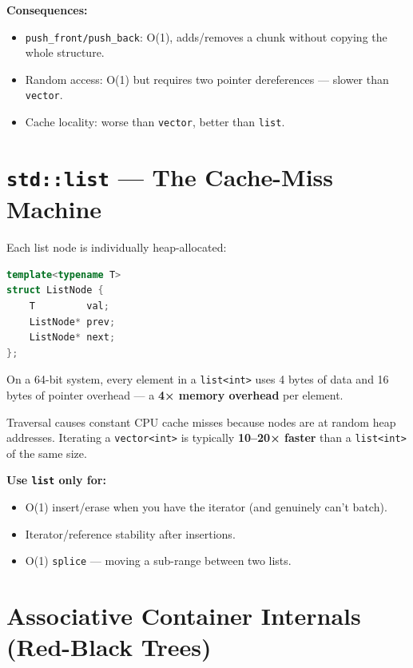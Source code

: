 \textbf{Consequences:}
\begin{itemize}
    \item \texttt{push\_front/push\_back}: O(1), adds/removes a chunk without copying the whole structure.
    \item Random access: O(1) but requires two pointer dereferences --- slower than \texttt{vector}.
    \item Cache locality: worse than \texttt{vector}, better than \texttt{list}.
\end{itemize}

\section{\texttt{std::list} --- The Cache-Miss Machine}
\label{sec:list-internals}

Each list node is individually heap-allocated:

\begin{lstlisting}[language=C++, caption={Conceptual list node layout}]
template<typename T>
struct ListNode {
    T         val;
    ListNode* prev;
    ListNode* next;
};
\end{lstlisting}

On a 64-bit system, every element in a \texttt{list<int>} uses 4 bytes of data and 16 bytes of pointer overhead --- a \textbf{4× memory overhead} per element.

Traversal causes constant CPU cache misses because nodes are at random heap addresses. Iterating a \texttt{vector<int>} is typically \textbf{10--20× faster} than a \texttt{list<int>} of the same size.

\textbf{Use \texttt{list} only for:}
\begin{itemize}
    \item O(1) insert/erase when you have the iterator (and genuinely can't batch).
    \item Iterator/reference stability after insertions.
    \item O(1) \texttt{splice} --- moving a sub-range between two lists.
\end{itemize}

\section{Associative Container Internals (Red-Black Trees)}
\label{sec:rbtree-internals}

